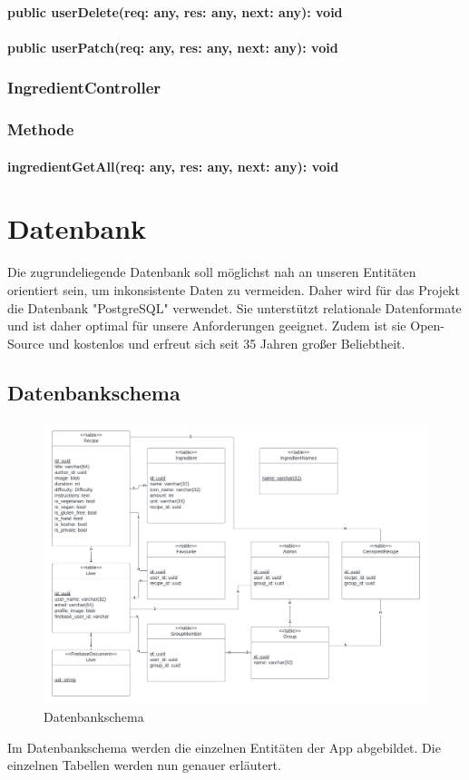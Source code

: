 \documentclass[parskip=full]{scrartcl}
\begin{document}
\paragraph{public userDelete(req: any, res: any, next: any): void}
\paragraph{public userPatch(req: any, res: any, next: any): void}

\subsubsection{IngredientController}
\subsubsection*{Methode}
\paragraph{ingredientGetAll(req: any, res: any, next: any): void}

\newpage

\section{Datenbank}
Die zugrundeliegende Datenbank soll möglichst nah an unseren Entitäten orientiert sein, um inkonsistente Daten zu vermeiden. Daher wird für das Projekt die Datenbank "PostgreSQL" verwendet. Sie unterstützt relationale Datenformate und ist daher optimal für unsere Anforderungen geeignet. Zudem ist sie Open-Source und kostenlos und erfreut sich seit 35 Jahren großer Beliebtheit.
\subsection{Datenbankschema}
\begin{figure}[htp]
    \centering
    \includegraphics[width = \linewidth]{images/Database/schema.png}
    \caption{Datenbankschema}
\end{figure}
Im Datenbankschema werden die einzelnen Entitäten der App abgebildet. Die einzelnen Tabellen werden nun genauer erläutert.
\newpage
\end{document}
